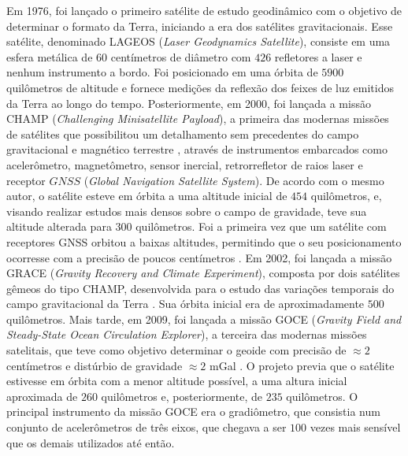 Em 1976, foi lançado o primeiro satélite de estudo geodinâmico com o objetivo de determinar o formato da Terra, iniciando a era dos satélites gravitacionais. Esse satélite, denominado LAGEOS (\textit{Laser Geodynamics Satellite}), consiste em uma esfera metálica de $60$ centímetros de diâmetro com $426$ refletores a laser e nenhum instrumento a bordo. Foi posicionado em uma órbita de $5900$ quilômetros de altitude e fornece medições da reflexão dos feixes de luz emitidos da Terra ao longo do tempo. Posteriormente, em 2000, foi lançada a missão CHAMP (\textit{Challenging Minisatellite Payload}), a primeira das modernas missões de satélites que possibilitou um detalhamento sem precedentes do campo gravitacional e magnético terrestre \cite{lobianco2005}, através de instrumentos embarcados como acelerômetro, magnetômetro, sensor inercial, retrorrefletor de raios laser e receptor  $GNSS$ (\textit{Global Navigation Satellite System}). De acordo com o mesmo autor, o satélite esteve em órbita a uma altitude inicial de $454$ quilômetros, e, visando realizar estudos mais densos sobre o campo de gravidade, teve sua altitude alterada para $300$ quilômetros. Foi a primeira vez que um satélite com receptores GNSS orbitou a baixas altitudes, permitindo que o seu posicionamento ocorresse com a precisão de poucos centímetros \cite{schwintzer2002}. Em 2002, foi lançada a missão GRACE (\textit{Gravity Recovery and Climate Experiment}), composta por dois satélites gêmeos do tipo CHAMP, desenvolvida para o estudo das variações temporais do campo gravitacional da Terra \cite{torge2001geodesy,schwintzer2002}. Sua órbita inicial era de aproximadamente $500$ quilômetros. Mais tarde, em 2009, foi lançada a missão GOCE (\textit{Gravity Field and Steady-State Ocean Circulation Explorer}), a terceira das modernas missões satelitais, que teve como objetivo determinar o geoide com precisão de $\approx 2$ centímetros \cite{torge2001geodesy} e distúrbio de gravidade $\approx 2$ mGal \cite{junior2019evoluccao}. O projeto previa que o satélite estivesse em órbita com a menor altitude possível, a uma altura inicial aproximada de $260$ quilômetros e, posteriormente, de $235$ quilômetros. O principal instrumento da missão GOCE era o gradiômetro, que consistia num conjunto de acelerômetros de três eixos, que chegava a ser $100$ vezes mais sensível que os demais utilizados até então. 

